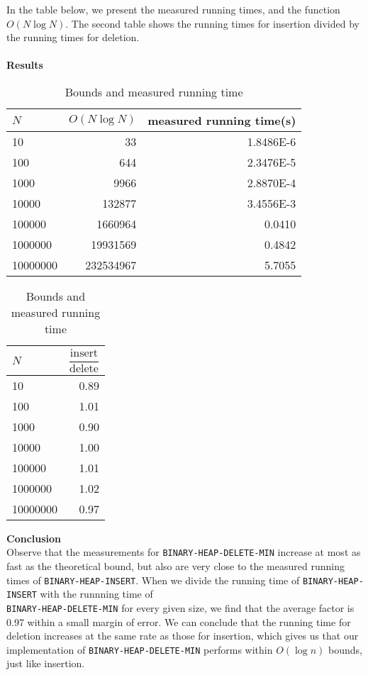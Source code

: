\documentclass[a4paper,10pt]{article}
\begin{document}
In the table below, we present the measured running times, and the function $O(N\log N)$. The second table shows the running times for insertion divided by the running times for deletion.\\\\
{\bf Results}\\
\begin{table}
  \begin{center}
    \begin{tabular}{l|r|r}
      $N$ & $O(N\log N)$ & measured running time(s)\\
      \hline
      10       & 33         & \num{1.8486E-6}\\
      100      & 644        & \num{2.3476E-5}\\
      1000     & 9966       & \num{2.8870E-4}\\
      10000    & 132877     & \num{3.4556E-3}\\
      100000   & 1660964    & \num{0.0410}\\
      1000000  & 19931569   & \num{0.4842}\\
      10000000 & 232534967  & \num{5.7055}
    \end{tabular}
    \caption{Bounds and measured running time}
  \end{center}
\end{table}
\begin{table}
  \begin{center}
    \begin{tabular}{l|r}
      $N$ & $\dfrac{\text{insert}}{\text{delete}}$\\
      \hline
      10       & \num{0.89}\\
      100      & \num{1.01}\\
      1000     & \num{0.90}\\
      10000    & \num{1.00}\\
      100000   & \num{1.01}\\
      1000000  & \num{1.02}\\
      10000000 & \num{0.97}
    \end{tabular}
    \caption{Bounds and measured running time}
  \end{center}
\end{table}
{\bf Conclusion}\\
Observe that the measurements for \texttt{BINARY-HEAP-DELETE-MIN} increase at most as fast as the theoretical bound, but also are very close to the measured running times of \texttt{BINARY-HEAP-INSERT}. When we divide the running time of \texttt{BINARY-HEAP-INSERT} with the runnning time of \\\texttt{BINARY\--HEAP\--DELETE\--MIN} for every given size, we find that the average factor is 0.97 within a small margin of error. We can conclude that the running time for deletion increases at the same rate as those for insertion, which gives us that our implementation of \texttt{BINARY-HEAP-DELETE-MIN} performs within $O(\log n)$ bounds, just like insertion.
\end{document}
